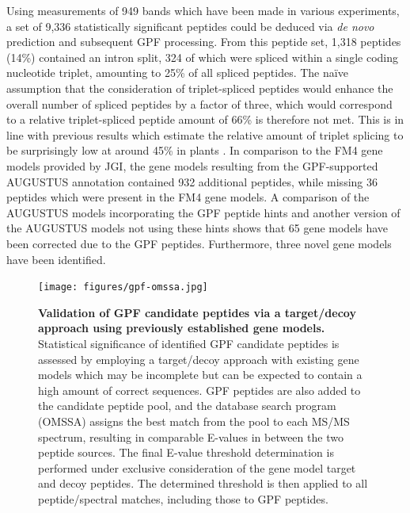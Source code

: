 Using measurements of 949 bands which have been made in various experiments,
a set of 9,336 statistically significant peptides could be deduced via 
{\em de novo} prediction and subsequent GPF processing.
From this peptide set, 1,318 peptides (14\%) contained an intron split,
324 of which were spliced within a single coding nucleotide triplet,
amounting to 25\% of all spliced peptides.
The na\"ive assumption that the consideration of triplet-spliced peptides
would enhance the overall number of spliced peptides by a factor of three,
which would correspond to a relative triplet-spliced peptide amount of 66\%
is therefore not met.
This is in line with previous results which estimate the relative amount
of triplet splicing to be surprisingly low at around 45\% in plants 
\citep{Tomita1996}.
In comparison to the FM4 gene models provided by JGI, the gene models 
resulting from the GPF-supported AUGUSTUS annotation contained 932 additional
peptides, while missing 36 peptides which were present in the FM4 gene models.
A comparison of the AUGUSTUS models incorporating the GPF peptide hints
and another version of the AUGUSTUS models not using these hints shows that
65 gene models have been corrected due to the GPF peptides.
Furthermore, three novel gene models have been identified.

\begin{figure}
\begin{center}
\texttt{[image: figures/gpf-omssa.jpg]}
\end{center}
\caption{
{\bf Validation of GPF candidate peptides via a target/decoy approach
    using previously established gene models.} 
    Statistical significance of identified GPF candidate peptides is 
    assessed by employing a target/decoy approach with existing gene models 
    which may be incomplete but can be expected to contain a high amount of 
    correct sequences.
    GPF peptides are also added to the candidate peptide pool, and the database
    search program (OMSSA) assigns the best match from the pool to each
    MS/MS spectrum, resulting in comparable E-values in between the two
    peptide sources.
    The final E-value threshold determination is performed under exclusive
    consideration of the gene model target and decoy peptides.
    The determined threshold is then applied to all peptide/spectral matches,
    including those to GPF peptides.
}
\label{fig:gpf-omssa}
\end{figure}


